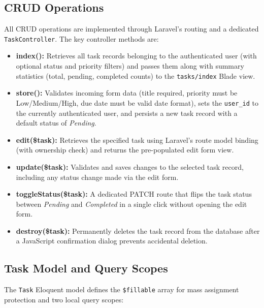 \documentclass[12pt,a4paper]{report}
\begin{document}
\begin{titlepage}
\subsection{CRUD Operations}

All CRUD operations are implemented through Laravel's routing and a dedicated
\texttt{TaskController}. The key controller methods are:

\begin{itemize}[leftmargin=1.5cm]
    \item \textbf{index():} Retrieves all task records belonging to the authenticated
    user (with optional status and priority filters) and passes them along with
    summary statistics (total, pending, completed counts) to the
    \texttt{tasks/index} Blade view.

    \item \textbf{store():} Validates incoming form data (title required, priority
    must be Low/Medium/High, due date must be valid date format), sets the
    \texttt{user\_id} to the currently authenticated user, and persists a new task
    record with a default status of \textit{Pending}.

    \item \textbf{edit(\$task):} Retrieves the specified task using Laravel's route
    model binding (with ownership check) and returns the pre-populated edit form view.

    \item \textbf{update(\$task):} Validates and saves changes to the selected task
    record, including any status change made via the edit form.

    \item \textbf{toggleStatus(\$task):} A dedicated PATCH route that flips the task
    status between \textit{Pending} and \textit{Completed} in a single click without
    opening the edit form.

    \item \textbf{destroy(\$task):} Permanently deletes the task record from the
    database after a JavaScript confirmation dialog prevents accidental deletion.
\end{itemize}

\subsection{Task Model and Query Scopes}

The \texttt{Task} Eloquent model defines the \texttt{\$fillable} array for mass
assignment protection and two local query scopes:


\end{titlepage}
\end{document}
